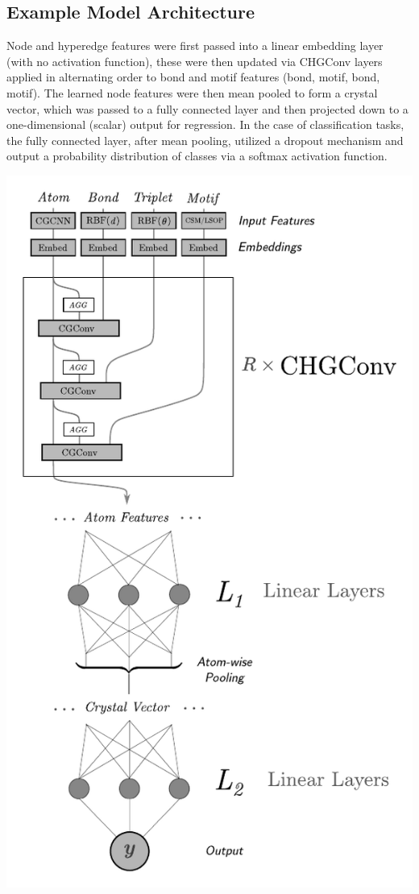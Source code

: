 \documentclass[10pt,a4paper]{article}
\begin{document}
\subsection{Example Model Architecture}
Node and hyperedge features were first passed into a linear embedding layer (with no activation function), these were then updated via CHGConv layers applied in alternating order to bond and motif features (bond, motif, bond, motif). The learned node features were then mean pooled to form a crystal vector, which was passed to a fully connected layer and then projected down to a one-dimensional (scalar) output for regression. In the case of classification tasks, the fully connected layer, after mean pooling, utilized a dropout mechanism and output a probability distribution of classes via a softmax activation function.

\begin{center}
\includegraphics[scale=.75]{arch.pdf}
\end{center}
\end{document}
